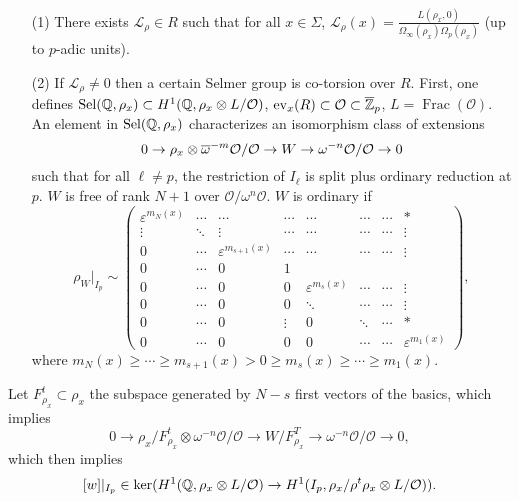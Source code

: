 \documentclass[12pt,amsfont]{amsart}
\begin{document}
\begin{cnj} 
{\ }
\begin{enumerate}
\item[(1)]
There exists $\mathcal{L}_\rho \in R$ such that for all $x \in \Sigma$, $\mathcal{L}_\rho(x) = \displaystyle \frac{L(\rho_x, 0)}{\Omega_\infty(\rho_x) \Omega_p(\rho_x)}$ (up to $p$-adic units). 
\item[(2)] 
If $\mathcal{L}_\rho \ne 0$ then a certain Selmer group is co-torsion over $R$.
First, one defines $\operatorname{Sel}({\mathbb Q}, \rho_x) \subset H^1({\mathbb Q}, \rho_x \otimes L/\mathcal{O})$, $\text{ev}_x(R) \subset \mathcal{O} \subset \overline{{\mathbb Z}}_p$, $L = \operatorname{Frac}(\mathcal{O})$. An element in $\operatorname{Sel}({\mathbb Q}, \rho_x)$ characterizes an isomorphism class of extensions 
$$\displaystyle 0 \rightarrow \rho_x \otimes \overline{\omega}^{-m} \mathcal{O}/\mathcal{O} \rightarrow W \rightarrow \omega^{-n} \mathcal{O}/\mathcal{O} \rightarrow 0$$
such that for all $\ell \ne p$, the restriction of $I_\ell$ is split plus ordinary reduction at $p$. $W$ is free of rank $N+1$ over $\mathcal{O}/\omega^n \mathcal{O}$. $W$ is ordinary if
\[\displaystyle \rho_W |_{I_p} \sim \begin{pmatrix} 
\varepsilon^{m_N(x)} & \cdots & \cdots & \cdots & \cdots & \cdots & \cdots & \ast \\ 
\vdots & \ddots & \vdots & \cdots & \cdots & \cdots & \cdots & \vdots \\
 0 & \cdots & \varepsilon^{m_{s+1}(x)} & \cdots & \cdots & \cdots & \cdots & \vdots \\ 
0 & \cdots & 0 & 1 &  &  &  &  \\  
0 & \cdots & 0 & 0 & \varepsilon^{m_s(x)} & \cdots & \cdots & \vdots \\ 
0 & \cdots & 0 & 0 & \ddots & \cdots & \cdots & \vdots \\ 
0 & \cdots & 0 & \vdots &  0 & \ddots & \cdots & \ast \\ 
0 & \cdots & 0 & 0 & 0 & \cdots & \cdots & \varepsilon^{m_1(x)} \end{pmatrix},
\]
where $m_N(x) \geq \cdots \geq m_{s+1}(x) > 0 \geq m_s(x) \geq \cdots \geq m_1(x)$.
\end{enumerate}
\end{cnj}

Let $F_{\rho_x}^t \subset \rho_x$ the subspace generated by $N-s$ first vectors of the basics, which implies
$$\displaystyle 0 \rightarrow \rho_x/F_{\rho_x}^t \otimes \omega^{-n} \mathcal{O}/\mathcal{O} \rightarrow W/F_{\rho_x}^T \rightarrow \omega^{-n} \mathcal{O}/\mathcal{O} \rightarrow 0,$$
which then implies
$$\displaystyle [w] |_{I_p} \in \ker(H^1({\mathbb Q}, \rho_x \otimes L/\mathcal{O}) \rightarrow H^1(I_p, \rho_x/\rho^t \rho_x \otimes L/\mathcal{O})).$$
\end{document}
